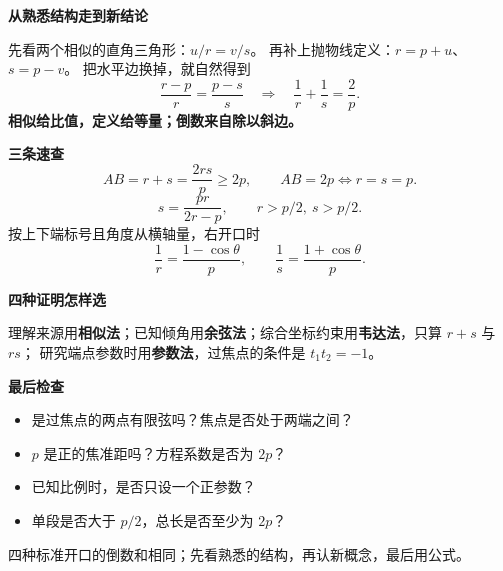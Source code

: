\clearpage
\begin{summarybox}
\textbf{\textcolor{CSummary}{从熟悉结构走到新结论}}

先看两个相似的直角三角形：$u/r=v/s$。
再补上抛物线定义：$r=p+u$、$s=p-v$。
把水平边换掉，就自然得到
\[
 \frac{r-p}{r}=\frac{p-s}{s}
 \quad\Longrightarrow\quad\boxed{\frac1r+\frac1s=\frac2p}.
\]
\textbf{相似给比值，定义给等量；倒数来自除以斜边。}

\par\medskip
\textbf{\textcolor{CSummary}{三条速查}}
\[
 AB=r+s=\frac{2rs}{p}\ge2p,\qquad
 AB=2p\iff r=s=p.
\]
\[
 s=\frac{pr}{2r-p},\qquad r>p/2,\ s>p/2.
\]
按上下端标号且角度从横轴量，右开口时
\[
 \frac1r=\frac{1-\cos\theta}{p},\qquad
 \frac1s=\frac{1+\cos\theta}{p}.
\]

\par\medskip
\textbf{\textcolor{CSummary}{四种证明怎样选}}

理解来源用\textbf{相似法}；已知倾角用\textbf{余弦法}；综合坐标约束用\textbf{韦达法}，只算 $r+s$ 与 $rs$；
研究端点参数时用\textbf{参数法}，过焦点的条件是 $t_1t_2=-1$。

\par\medskip
\textbf{\textcolor{CSummary}{最后检查}}
\begin{itemize}[leftmargin=*,itemsep=.35em]
\item 是过焦点的两点有限弦吗？焦点是否处于两端之间？
\item $p$ 是正的焦准距吗？方程系数是否为 $2p$？
\item 已知比例时，是否只设一个正参数？
\item 单段是否大于 $p/2$，总长是否至少为 $2p$？
\end{itemize}
四种标准开口的倒数和相同；先看熟悉的结构，再认新概念，最后用公式。
\end{summarybox}

